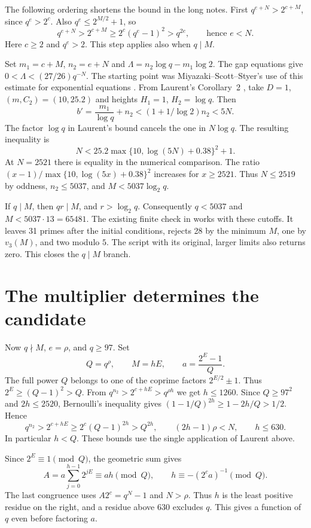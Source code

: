 \documentclass[11pt]{article}
\begin{document}
The following ordering shortens the bound in the long notes.
First $q^{e+N}>2^{c+M}$, since $q^e>2^c$. Also $q^e\le2^{M/2}+1$,
so
\[
 q^{e+N}>2^{c+M}\ge 2^c(q^e-1)^2>q^{2e},
 \qquad\text{hence } e<N.
\]
Here $c\ge2$ and $q^e>2$. This step applies also when $q\mid M$.

Set $m_1=c+M$, $n_2=e+N$ and $\Lambda=n_2\log q-m_1\log 2$.
The gap equations give $0<\Lambda<(27/26)q^{-N}$.
The starting point was Miyazaki--Scott--Styer's use of this
estimate for exponential equations \cite[Proposition~6.1]{MSS}.
From Laurent's Corollary~2
\cite{Laurent}, take $D=1$, $(m,C_2)=(10,25.2)$ and heights
$H_1=1$, $H_2=\log q$. Then
\[
 b'=\frac{m_1}{\log q}+n_2
 <(1+1/\log 2)n_2<5N.
\]
The factor $\log q$ in Laurent's bound cancels the one in
$N\log q$. The resulting inequality is
\[
 N<25.2\max\{10,\log(5N)+0.38\}^2+1.
\]
At $N=2521$ there is equality in the numerical comparison.
The ratio $(x-1)/\max\{10,\log(5x)+0.38\}^2$ increases
for $x\ge2521$. Thus $N\le2519$ by oddness, $n_2\le5037$,
and $M<5037\log_2 q$.

If $q\mid M$, then $qr\mid M$, and $r>\log_2 q$.
Consequently $q<5037$ and $M<5037\cdot13=65481$.
The existing finite check in 
works with these cutoffs. It leaves 31 primes after the initial
conditions, rejects 28 by the minimum $M$, one by $v_3(M)$, and
two modulo $5$. The script with its original, larger limits also
returns zero. This closes the $q\mid M$ branch.

\section{The multiplier determines the candidate}

Now $q\nmid M$, $e=\rho$, and $q\ge97$. Set
\[
 Q=q^\rho,\qquad M=hE,\qquad a=\frac{2^E-1}{Q}.
\]
The full power $Q$ belongs to one of the coprime factors $2^{E/2}\pm1$.
Thus $2^E\ge(Q-1)^2>Q$. From
$q^{n_2}>2^{c+hE}>q^{\rho h}$ we get $h\le1260$.
Since $Q\ge97^2$ and $2h\le2520$, Bernoulli's inequality gives
$(1-1/Q)^{2h}\ge1-2h/Q>1/2$. Hence
\[
 q^{n_2}>2^{c+hE}\ge 2^c(Q-1)^{2h}>Q^{2h},
 \qquad (2h-1)\rho<N,\qquad h\le630.
\]
In particular $h<Q$. These bounds use the single application
of Laurent above.

Since $2^E\equiv1\pmod Q$, the geometric sum gives
\[
 A=a\sum_{j=0}^{h-1}2^{jE}\equiv ah\pmod Q,
 \qquad
 h\equiv-(2^ca)^{-1}\pmod Q.
\]
The last congruence uses $A2^c=q^N-1$ and $N>\rho$.
Thus $h$ is the least positive residue on the right, and a residue
above $630$ excludes $q$. This gives a function of $q$ even before
factoring $a$.
\end{document}
